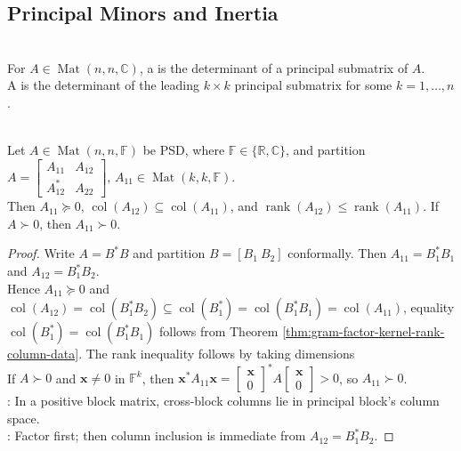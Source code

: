\subsection{Principal Minors and Inertia}

\begin{definition} \label{def:principal-and-leading-principal-minors} \\
For $A\in\operatorname{Mat}(n,n,\mathbb{C})$, a  is the determinant of a principal submatrix of $A$.\\
A  is the determinant of the leading $k\times k$ principal submatrix for some $k=1,\ldots,n$.
\end{definition}

\begin{corollary} \label{cor:positive-semidefinite-principal-block-column-inclusion} \\
Let $A\in\operatorname{Mat}(n,n,\mathbb{F})$ be PSD, where $\mathbb{F}\in\{\mathbb{R},\mathbb{C}\}$, and partition $A=
\begin{bmatrix}
A_{11} & A_{12}\\
A_{12}^* & A_{22}
\end{bmatrix}$, $A_{11}\in\operatorname{Mat}(k,k,\mathbb{F})$.\\
Then $A_{11}\succeq0$, $\operatorname{col}(A_{12})\subseteq\operatorname{col}(A_{11})$, and $\operatorname{rank}(A_{12})\leq\operatorname{rank}(A_{11})$. If $A\succ0$, then $A_{11}\succ0$.
\begin{proof}
Write $A=B^*B$ and partition $B=[B_1\ B_2]$ conformally. Then $A_{11}=B_1^*B_1$ and $A_{12}=B_1^*B_2$.\\
Hence $A_{11}\succeq0$ and $\operatorname{col}(A_{12})=\operatorname{col}(B_1^*B_2)\subseteq\operatorname{col}(B_1^*)=\operatorname{col}(B_1^*B_1)=\operatorname{col}(A_{11})$, equality $\operatorname{col}(B_1^*)=\operatorname{col}(B_1^*B_1)$ follows from Theorem \ref{thm:gram-factor-kernel-rank-column-data}. The rank inequality follows by taking dimensions\\
If $A\succ0$ and $\mathbf{x}\neq0$ in $\mathbb{F}^k$, then $\mathbf{x}^*A_{11}\mathbf{x}=
\begin{bmatrix}\mathbf{x}\\0\end{bmatrix}^*
A
\begin{bmatrix}\mathbf{x}\\0\end{bmatrix}>0$, so $A_{11}\succ0$.\\
: In a positive block matrix, cross-block columns lie in principal block's column space.\\
: Factor first; then column inclusion is immediate from $A_{12}=B_1^*B_2$.
\end{proof}
\end{corollary}

